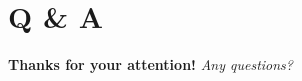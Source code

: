\section{Q \& A}
\begin{frame}[plain]
        \begin{spacing}{1.5}
        \begin{center}
        \Huge{\textbf{Thanks for your attention!}}
        \Huge{\textit{Any questions?}}
        \end{center}
        \end{spacing}
\end{frame}



